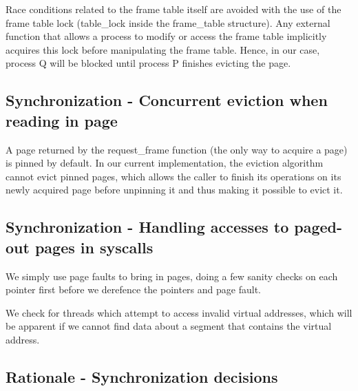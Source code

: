 Race conditions related to the frame table itself are avoided with the use of the frame table lock (table_lock inside the frame_table structure).
Any external function that allows a process to modify or access the frame table implicitly acquires this lock before manipulating the frame table.
Hence, in our case, process Q will be blocked until process P finishes evicting the page.

\subsection{Synchronization - Concurrent eviction when reading in page}

A page returned by the request_frame function (the only way to acquire a page) is pinned by default.
In our current implementation, the eviction algorithm cannot evict pinned pages, which allows the caller to finish its operations on its newly acquired page before unpinning it and thus making it possible to evict it.

\subsection{Synchronization - Handling accesses to paged-out pages in syscalls}


We simply use page faults to bring in pages, doing a few sanity checks on each
pointer first before we derefence the pointers and page fault.

We check for threads which attempt to access invalid virtual addresses, which
will be apparent if we cannot find data about a segment that contains the
virtual address.

\subsection{Rationale - Synchronization decisions}


